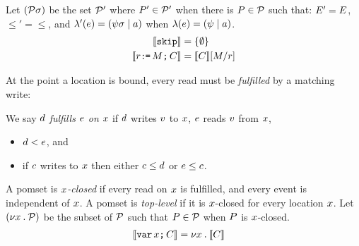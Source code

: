 \begin{definition}
Let $(\mathcal{P}\sigma)$ be the set $\mathcal{P}'$ where $P'\in\mathcal{P}'$ when
there is $P\in\mathcal{P}$ such that:
$E' = E$,
${\le'} = {\le}$, 
and
$\lambda'(e) = (\psi\sigma \mid a)$ when $\lambda(e) = (\psi \mid a)$.
\begin{align*}
  \llbracket\texttt{skip}\rrbracket & =
  \{ \emptyset \}
  \\  
  \llbracket r\texttt{:}\mkern-1mu\texttt{=}\,M\texttt{;}\,\allowbreak C\rrbracket & =
  \llbracket C\rrbracket[M/r] 
\end{align*}
\end{definition}

At the point a location is bound, every read must be \emph{fulfilled} by a
matching write:

\begin{definition}
  \label{def:rf}
  We say $d$ \emph{fulfills $e$ on $x$} if $d$ \externally writes
  $v$ to $x$, $e$ \externally reads $v$ from $x$,
  \begin{itemize}
  \item
    $d < e$, and
  \item
    if $c$ \externally writes to $x$ then either $c \leq d$ or $e \leq c$.
  \end{itemize}

  A pomset is \emph{$x$-closed} if every \external read on $x$ is fulfilled,
  and every event is independent of $x$.
  A pomset is \emph{top-level} if it is $x$-closed for every location $x$.
  Let $(\nu x\mathbin.\mathcal{P})$ be the subset of $\mathcal{P}$ such that $P\in\mathcal{P}$
  when $P$ is $x$-closed.
\begin{align*}
  \llbracket\texttt{var}\,x\texttt{;}\,\allowbreak C\rrbracket & =
  \nu x \mathbin. \llbracket C\rrbracket  
\end{align*}
\end{definition}

